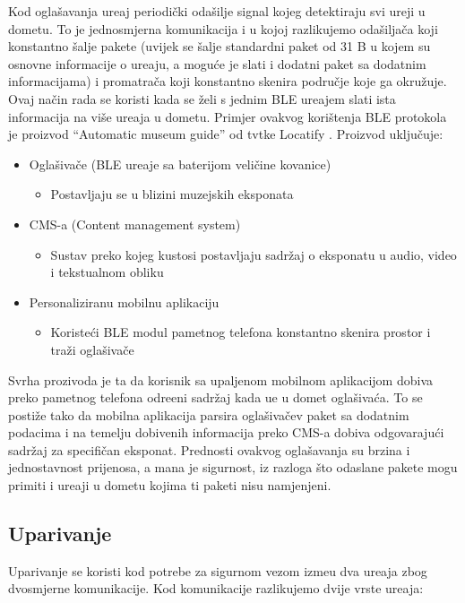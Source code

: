Kod ogla\v{s}avanja ure\dj aj periodi\v{c}ki oda\v{s}ilje signal kojeg detektiraju svi ure\dj ji u dometu. To je jednosmjerna komunikacija i u kojoj razlikujemo oda\v{s}ilja\v{c}a koji konstantno \v{s}alje pakete (uvijek se \v{s}alje standardni paket od 31 B u kojem su osnovne informacije o ure\dj aju, a mogu\'{c}e je slati i dodatni paket sa dodatnim informacijama) i promatra\v{c}a koji konstantno skenira podru\v{c}je koje ga okru\v{z}uje. Ovaj na\v{c}in rada se koristi kada se \v{z}eli s jednim BLE ure\dj ajem slati ista informacija na vi\v{s}e ure\dj aja u dometu. Primjer ovakvog kori\v{s}tenja BLE protokola je proizvod ``Automatic museum guide'' od tvtke Locatify \cite{automatic_museum_guide} . Proizvod uklju\v{c}uje:


\begin{itemize}
	\item Ogla\v{s}iva\v{c}e (BLE ure\dj aje sa baterijom veli\v{c}ine kovanice)
	\begin{itemize}
		\item Postavljaju se u blizini muzejskih eksponata
	\end{itemize}
	\item CMS-a (Content management system)
	\begin{itemize}
		\item Sustav preko kojeg kustosi postavljaju sadr\v{z}aj o eksponatu u audio, video i tekstualnom obliku
	\end{itemize}
	
	\item Personaliziranu mobilnu aplikaciju
	\begin{itemize}
		\item Koriste\'{c}i BLE modul pametnog telefona konstantno skenira prostor i tra\v{z}i ogla\v{s}iva\v{c}e
	\end{itemize}
\end{itemize}

Svrha prozivoda je ta da korisnik sa upaljenom mobilnom aplikacijom dobiva preko pametnog telefona odre\dj eni sadr\v{z}aj kada u\dj e u domet ogla\v{s}iva\'{c}a. To se posti\v{z}e tako da mobilna aplikacija parsira ogla\v{s}iva\v{c}ev paket sa dodatnim podacima i na temelju dobivenih informacija preko CMS-a dobiva odgovaraju\'{c}i sadr\v{z}aj za specifi\v{c}an eksponat.
Prednosti ovakvog ogla\v{s}avanja su brzina i jednostavnost prijenosa, a mana je sigurnost, iz razloga \v{s}to odaslane pakete mogu primiti i ure\dj aji u dometu kojima ti paketi nisu namjenjeni.


\subsection{Uparivanje}
Uparivanje se koristi kod potrebe za sigurnom vezom izme\dj u dva ure\dj aja zbog dvosmjerne komunikacije. Kod komunikacije razlikujemo dvije vrste ure\dj aja:


